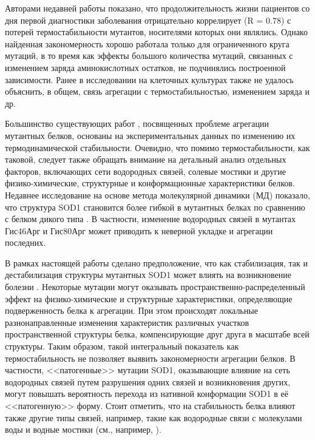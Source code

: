 
{\actuality} Авторами недавней работы \cite{Bystrom2010} показано, что продолжительность жизни пациентов со дня первой диагностики заболевания отрицательно коррелирует (R = $0.78$) с потерей термостабильности мутантов, носителями которых они являлись. Однако найденная закономерность хорошо работала только для ограниченного круга мутаций, в то время как эффекты большого количества мутаций, связанных с изменением заряда аминокислотных остатков, не подчинялись построенной зависимости. Ранее в исследовании на клеточных культурах также не удалось объяснить, в общем, связь агрегации с термостабильностью, изменением заряда и др. \cite{Prudencio2009}

Большинство существующих работ \cite{Chiti2009,Sato2005,Stathopulos2003}, посвященных проблеме агрегации мутантных белков, основаны на экспериментальных данных по изменению их термодинамической стабильности. Очевидно, что помимо термостабильности, как таковой, следует также обращать внимание на детальный анализ отдельных факторов, включающих сети водородных связей, солевые мостики и другие физико-химические, структурные и конформационные характеристики белков. 
Недавнее исследование на основе метода молекулярной динамики (МД) \cite{Alder1959} показало, что структура SOD1 становится более гибкой в мутантных белках по сравнению с белком дикого типа \cite{Keerthana2015}. В частности, изменение водородных связей в мутантах Гис46Арг и Гис80Арг может приводить к неверной укладке и агрегации последних.

В рамках настоящей работы сделано предположение, что как стабилизация, так и дестабилизация структуры мутантных SOD1 может влиять на возникновение болезни \cite{Alemasov2014}. Некоторые мутации могут оказывать пространственно-распределенный эффект на физико-химические и структурные характеристики, определяющие подверженность белка к агрегации. При этом происходят локальные разнонаправленные изменения характеристик различных участков пространственной структуры белка, компенсирующие друг друга в масштабе всей структуры. Таким образом, такой интегральный показатель как термостабильность не позволяет выявить закономерности агрегации белков. В частности, <<патогенные>> мутации SOD1, оказывающие влияние на сеть водородных связей путем разрушения одних связей и возникновения других, могут повышать вероятность перехода из нативной конформации SOD1 в её <<патогенную>> форму. Стоит отметить, что на стабильность белка влияют также другие типы связей, например, такие как водородные связи с молекулами воды и водные мостики (см., например, \cite{Papoian2003,Petukhov1999}). 

